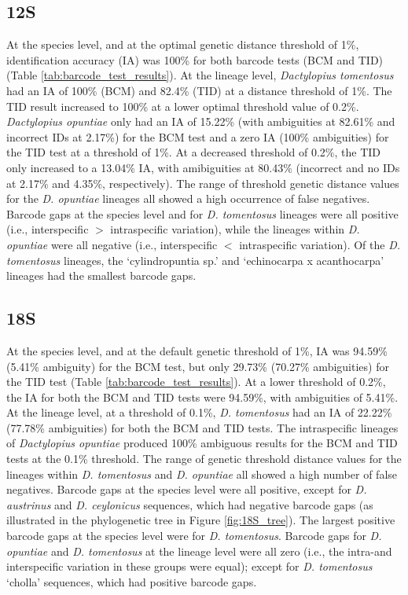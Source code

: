 \subsection{12S}
At the species level, and at the optimal genetic distance threshold of 1\%, identification accuracy (IA) was 100\% for both barcode tests (BCM and TID) (Table \ref{tab:barcode_test_results}). At the lineage level, \textit{Dactylopius tomentosus} had an IA of 100\% (BCM) and 82.4\% (TID) at a distance threshold of 1\%. The TID result increased to 100\% at a lower optimal threshold value of 0.2\%. \textit{Dactylopius opuntiae} only had an IA of 15.22\% (with ambiguities at 82.61\% and incorrect IDs at 2.17\%) for the BCM test and a zero IA (100\% ambiguities) for the TID test at a threshold of 1\%. At a decreased threshold of 0.2\%, the TID only increased to a 13.04\% IA, with amibiguities at 80.43\% (incorrect and no IDs at 2.17\% and 4.35\%, respectively). The range of threshold genetic distance values for the \textit{D. opuntiae} lineages all showed a high occurrence of false negatives. 
Barcode gaps at the species level and for \textit{D. tomentosus} lineages were all positive (i.e., interspecific $>$ intraspecific variation), while the lineages within \textit{D. opuntiae} were all negative (i.e., interspecific $<$ intraspecific variation). Of the \textit{D. tomentosus} lineages, the `cylindropuntia sp.' and `echinocarpa x acanthocarpa' lineages had the smallest barcode gaps. 

\subsection{18S}
At the species level, and at the default genetic threshold of 1\%, IA was 94.59\% (5.41\% ambiguity) for the BCM test, but only 29.73\% (70.27\% ambiguities) for the TID test (Table \ref{tab:barcode_test_results}). At a lower threshold of 0.2\%, the IA for both the BCM and TID tests were 94.59\%, with ambiguities of 5.41\%. At the lineage level, at a threshold of 0.1\%, \textit{D. tomentosus} had an IA of 22.22\% (77.78\% ambiguities) for both the BCM and TID tests. The intraspecific lineages of \textit{Dactylopius opuntiae} produced 100\% ambiguous results for the BCM and TID tests at the 0.1\% threshold. The range of genetic threshold distance values for the lineages within \textit{D. tomentosus} and \textit{D. opuntiae} all showed a high number of false negatives. 
Barcode gaps at the species level were all positive, except for \textit{D. austrinus} and \textit{D. ceylonicus} sequences, which had negative barcode gaps (as illustrated in the phylogenetic tree in Figure \ref{fig:18S_tree}). The largest positive barcode gaps at the species level were for \textit{D. tomentosus}. Barcode gaps for \textit{D. opuntiae} and \textit{D. tomentosus} at the lineage level were all zero (i.e., the intra-and interspecific variation in these groups were equal); except for \textit{D. tomentosus} `cholla' sequences, which had positive barcode gaps. 

